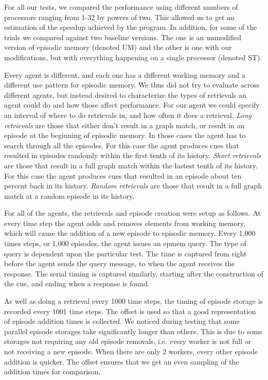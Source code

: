 \documentclass[11pt]{article} %
\begin{document}
For all our tests, we compared the performance using different numbers of processors
ranging from 1-32 by powers of two. This allowed us to get an estimation of the speedup
achieved by the program. In addition, for some of the trials we compared against two 
baseline versions. The one is an unmodified version of episodic memory (denoted UM) and
the other is one with our modifications, but with everything happening on a single processor 
(denoted ST). 

Every agent is different, and each one has a different working memory and a different
use pattern for episodic memory. We thus did not try to evaluate across different agents, 
but instead desired to characterize the types of retrievals an agent could do and how those
affect performance. For our agent we could specify an interval of where to do retrievals 
in, and how often it does a retrieval. 
\emph{Long retrievals} are those that either don't result in a graph match, or 
result in an episode at the beginning of episodic memory. In those cases the agent has to 
search through all the episodes. For this case the agent produces cues that resulted
in episodes randomly within the first tenth of its history. \emph{Short retrievals} are those
that result in a full graph match within the lastest tenth of its history. For this case the agent produces 
cues that resulted in an episode about ten percent back in its history. \emph{Random retrievals} are
those that result in a full graph match at a random episode in its history. 

For all of the agents, the retrievals and episode creation were setup as
follows. At every time step the agent adds and removes elements from working
memory, which will cause the addition of a new episode to episodic memory. Every
1,000 times steps, or 1,000 episodes, the agent issues an epmem query. The type of
query is dependent upon the particular test. The time is captured from right before the agent sends the query
message, to when the agent receives the response. The serial timing is captured
similarly, starting after the construction of the cue, and ending when a
response is found.

As well as doing a retrieval every 1000 time steps, the timing of episode
storage is recorded every 1001 time steps. The offset is used so that a good
representation of episode addition times is collected. We noticed during testing
that some parallel episode storages take significantly longer than others. This
is due to some storages not requiring any old episode removals, i.e. every worker
is not full or not receiving a new episode. When there are only 2 workers, every
other episode addition is quicker. The offset ensures that we get an even
sampling of the addition times for comparison.
\end{document}
